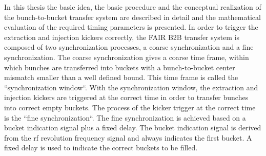 In this thesis the basic idea, the basic procedure and the conceptual realization of the bunch-to-bucket transfer system are described in detail and the mathematical evaluation of the required timing parameters is presented. In order to trigger the extraction and injection kickers correctly, the FAIR B2B transfer system is composed of two synchronization processes, a coarse synchronization and a fine synchronization. The coarse synchronization gives a coarse time frame, within which bunches are transferred into buckets with a bunch-to-bucket center mismatch smaller than a well defined bound. This time frame is called the ``synchronization window``. With the synchronization window, the extraction and injection kickers are triggered at the correct time in order to transfer bunches into correct empty buckets. The process of the kicker trigger at the correct time is the ``fine synchronization``. The fine synchronization is achieved based on a bucket indication signal plus a fixed delay. The bucket indication signal is derived from the rf revolution frequency signal and always indicates the first bucket. A fixed delay is used to indicate the correct buckets to be filled.

